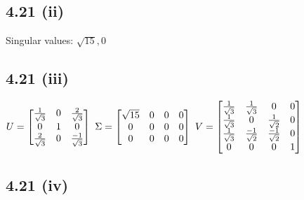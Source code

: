 \documentclass[letterpaper,12pt]{article}
\theoremstyle{definition}
\begin{document}
\subsection*{4.21 (ii)}


Singular values: $\sqrt{15}, 0$

\subsection*{4.21 (iii)}


        $U = \begin{bmatrix} 
        \frac{1}{\sqrt{3}} & 0 & \frac{2}{\sqrt{3}}\\
        0 & 1 & 0\\
        \frac{2}{ \sqrt{3}} & 0 & \frac{-1}{\sqrt{3}}
    \end{bmatrix}~
    \Sigma = \begin{bmatrix}
        \sqrt{15} &0&0&0\\
        0&0&0&0\\
        0&0&0&0
    \end{bmatrix}~
    V = \begin{bmatrix} 
        \frac{1}{\sqrt{3}} & \frac{1}{\sqrt{3}} & 0 & 0\\
        \frac{1}{\sqrt{3}} & 0 & \frac{1}{\sqrt{2}} & 0\\
        \frac{1}{\sqrt{3}} & \frac{-1}{\sqrt{2}} & \frac{-1}{\sqrt{2}} &0\\
        0&0&0&1
    \end{bmatrix}\\$

\subsection*{4.21 (iv)}
\end{document}
